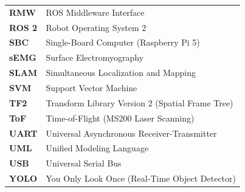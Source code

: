 \begin{longtable}{p{3.0cm}p{12.0cm}}
\textbf{RMW} & ROS Middleware Interface \\
\textbf{ROS 2} & Robot Operating System 2 \\
\textbf{SBC} & Single-Board Computer (Raspberry Pi 5) \\
\textbf{sEMG} & Surface Electromyography \\
\textbf{SLAM} & Simultaneous Localization and Mapping \\
\textbf{SVM} & Support Vector Machine \\
\textbf{TF2} & Transform Library Version 2 (Spatial Frame Tree) \\
\textbf{ToF} & Time-of-Flight (MS200 Laser Scanning) \\
\textbf{UART} & Universal Asynchronous Receiver-Transmitter \\
\textbf{UML} & Unified Modeling Language \\
\textbf{USB} & Universal Serial Bus \\
\textbf{YOLO} & You Only Look Once (Real-Time Object Detector) \\
\bottomrule
\end{longtable}
